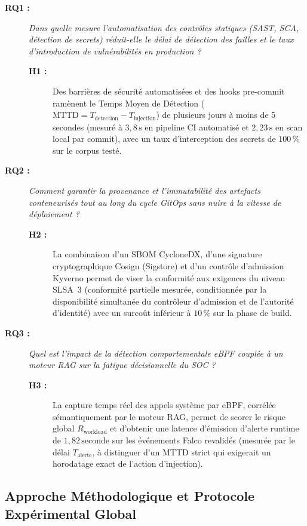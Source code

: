 \begin{description}
    \item[\textbf{RQ1 :}] \textit{Dans quelle mesure l'automatisation des contrôles statiques (SAST, SCA, détection de secrets) réduit-elle le délai de détection des failles et le taux d'introduction de vulnérabilités en production ?}
    \begin{description}
        \item[\textbf{H1 :}] Des barrières de sécurité automatisées et des hooks pre-commit ramènent le Temps Moyen de Détection ($\text{MTTD} = T_{\text{detection}} - T_{\text{injection}}$) de plusieurs jours à moins de 5 secondes (mesuré à $3{,}8\,\text{s}$ en pipeline CI automatisé et $2{,}23\,\text{s}$ en scan local par commit), avec un taux d'interception des secrets de $100\,\%$ sur le corpus testé.
    \end{description}
    \item[\textbf{RQ2 :}] \textit{Comment garantir la provenance et l'immutabilité des artefacts conteneurisés tout au long du cycle GitOps sans nuire à la vitesse de déploiement ?}
    \begin{description}
        \item[\textbf{H2 :}] La combinaison d'un SBOM CycloneDX, d'une signature cryptographique Cosign (Sigstore) et d'un contrôle d'admission Kyverno permet de viser la conformité aux exigences du niveau SLSA~3 (conformité partielle mesurée, conditionnée par la disponibilité simultanée du contrôleur d'admission et de l'autorité d'identité) avec un surcoût inférieur à $10\,\%$ sur la phase de build.
    \end{description}
    \item[\textbf{RQ3 :}] \textit{Quel est l'impact de la détection comportementale eBPF couplée à un moteur RAG sur la fatigue décisionnelle du SOC ?}
    \begin{description}
        \item[\textbf{H3 :}] La capture temps réel des appels système par eBPF, corrélée sémantiquement par le moteur RAG, permet de scorer le risque global $R_{\text{workload}}$ et d'obtenir une latence d'émission d'alerte runtime de $1{,}82\,\text{seconde}$ sur les événements Falco revalidés (mesurée par le délai $T_{\text{alerte}}$, à distinguer d'un MTTD strict qui exigerait un horodatage exact de l'action d'injection).
    \end{description}
\end{description}

\subsection{Approche Méthodologique et Protocole Expérimental Global}
\label{subsec:protocole_experimental}

